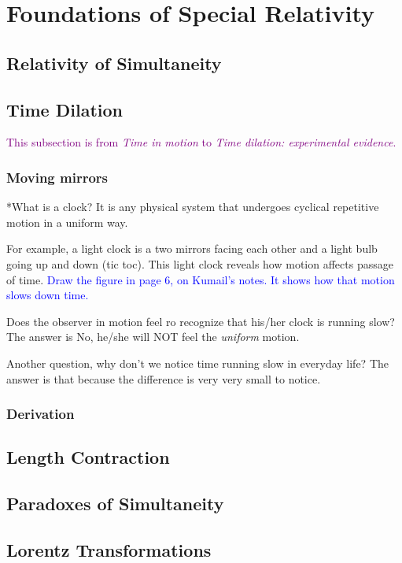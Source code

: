 
\section{Foundations of Special Relativity}

\subsection{Relativity of Simultaneity}

\subsection{Time Dilation}
\textcolor{purple}{This subsection is from \textit{Time in motion} to \textit{Time dilation: experimental evidence}.}

\subsubsection{Moving mirrors}
*What is a clock?
It is any physical system that undergoes cyclical repetitive motion in a uniform way. 

For example, a light clock is a two mirrors facing each other and a light bulb going up and down (tic toc). This light clock reveals
how motion affects passage of time. \textcolor{blue}{Draw the figure in page 6, on Kumail's notes. It shows how that motion slows down time.} 

Does the observer in motion feel ro recognize that his/her clock is running slow?
The answer is No, he/she will NOT feel the \textit{uniform} motion.  

Another question, why don't we notice time running slow in everyday life?
The answer is that because the difference is very very small to notice.
\subsubsection{Derivation}

\subsection{Length Contraction}

\subsection{Paradoxes of Simultaneity}

\subsection{Lorentz Transformations}
